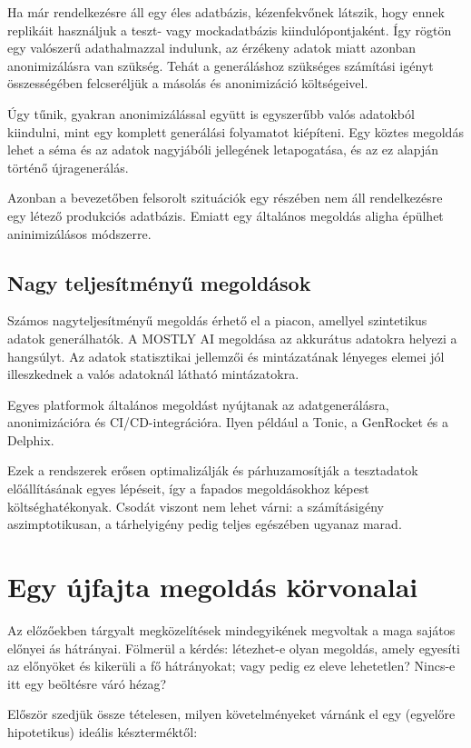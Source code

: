 \documentclass[
    parspace,
    noindent,
    nohyp,
]{elteiktdk}[2023/04/10]
\begin{document}
Ha már rendelkezésre áll egy éles adatbázis, kézenfekvőnek látszik,
hogy ennek replikáit használjuk a teszt- vagy mockadatbázis kiindulópontjaként.
Így rögtön egy valószerű adathalmazzal indulunk,
az érzékeny adatok miatt azonban anonimizálásra van szükség.
Tehát a generáláshoz szükséges számítási igényt összességében
felcseréljük a másolás és anonimizáció költségeivel.

Úgy tűnik, gyakran anonimizálással együtt is egyszerűbb valós adatokból kiindulni,
mint egy komplett generálási folyamatot kiépíteni.
Egy köztes megoldás lehet a séma és az adatok nagyjábóli jellegének letapogatása,
és az ez alapján történő újragenerálás.

Azonban a bevezetőben felsorolt szituációk egy részében nem áll rendelkezésre egy létező produkciós adatbázis.
Emiatt egy általános megoldás aligha épülhet aninimizálásos módszerre.

\subsection{Nagy teljesítményű megoldások}

Számos nagyteljesítményű megoldás érhető el a piacon, amellyel szintetikus adatok generálhatók. A MOSTLY AI megoldása az akkurátus adatokra helyezi a hangsúlyt. Az adatok statisztikai jellemzői és mintázatának lényeges elemei jól illeszkednek a valós adatoknál látható mintázatokra.

Egyes platformok általános megoldást nyújtanak az adatgenerálásra, anonimizációra és CI/CD-integrációra.
Ilyen például a Tonic, a GenRocket és a Delphix.

Ezek a rendszerek erősen optimalizálják és párhuzamosítják a tesztadatok előállításának egyes lépéseit,
így a fapados megoldásokhoz képest költséghatékonyak.
Csodát viszont nem lehet várni: a számításigény aszimptotikusan,
a tárhelyigény pedig teljes egészében ugyanaz marad.

\section{Egy újfajta megoldás körvonalai}

Az előzőekben tárgyalt megközelítések mindegyikének megvoltak a maga sajátos előnyei ás hátrányai.
Fölmerül a kérdés: létezhet-e olyan megoldás, amely egyesíti az előnyöket és kikerüli a fő hátrányokat;
vagy pedig ez eleve lehetetlen?
Nincs-e itt egy beöltésre váró hézag?

Először szedjük össze tételesen, milyen követelményeket várnánk el
egy (egyelőre hipotetikus) ideális készterméktől:
\end{document}
